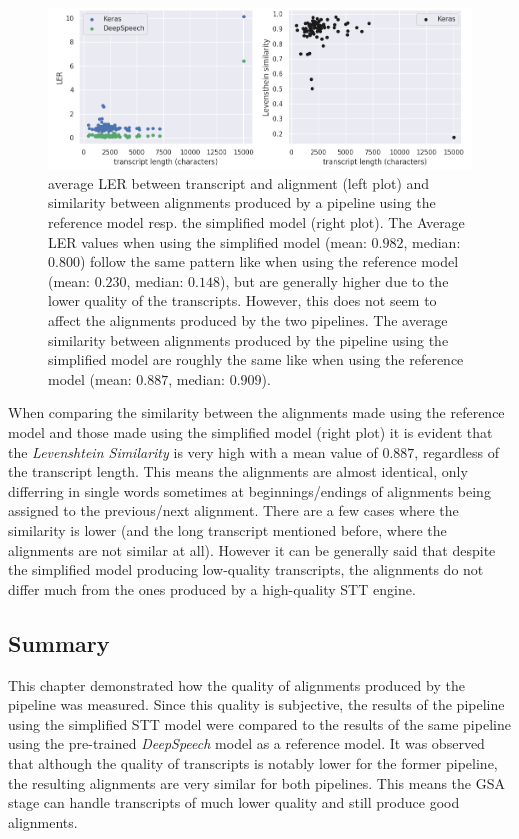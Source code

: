\begin{figure}[h!]
	\includegraphics[width=\linewidth]{./img/scatterplot_ls.png}
	\caption{average \ac{LER} between transcript and alignment (left plot) and similarity between alignments produced by a pipeline using the reference model resp. the simplified model (right plot). The Average \ac{LER} values when using the simplified model (mean: $0.982$, median: $0.800$) follow the same pattern like when using the reference model (mean: $0.230$, median: $0.148$), but are generally higher due to the lower quality of the transcripts. However, this does not seem to affect the alignments produced by the two pipelines. The average similarity between alignments produced by the pipeline using the simplified model are roughly the same like when using the reference model (mean: $0.887$, median: $0.909$).}
	\label{pipeline_scatterplot_ls_en}
\end{figure}

When comparing the similarity between the alignments made using the reference model and those made using the simplified model (right plot) it is evident that the \textit{Levenshtein Similarity} is very high with a mean value of $0.887$, regardless of the transcript length. This means the alignments are almost identical, only differring in single words sometimes at beginnings/endings of alignments being assigned to the previous/next alignment. There are a few cases where the similarity is lower (and the long transcript mentioned before, where the alignments are not similar at all). However it can be generally said that despite the simplified model producing low-quality transcripts, the alignments do not differ much from the ones produced by a high-quality \ac{STT} engine.

\subsection{Summary}

This chapter demonstrated how the quality of alignments produced by the pipeline was measured. Since this quality is subjective, the results of the pipeline using the simplified \ac{STT} model were compared to the results of the same pipeline using the pre-trained \textit{DeepSpeech} model as a reference model. It was observed that although the quality of transcripts is notably lower for the former pipeline, the resulting alignments are very similar for both pipelines. This means the \ac{GSA} stage can handle transcripts of much lower quality and still produce good alignments.